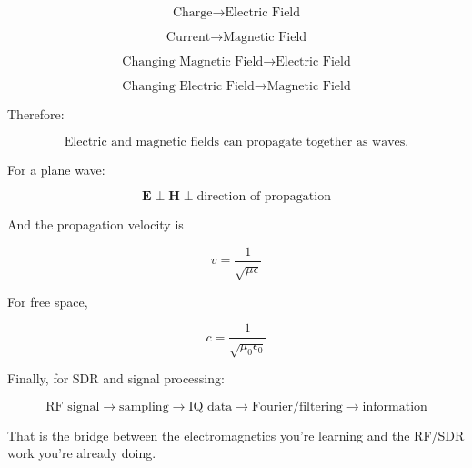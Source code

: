 \documentclass[11pt]{article}
\newcommand{\vect}[1]{\mathbf{#1}}
\begin{document}
\[
\boxed{
\text{Charge}
\rightarrow
\text{Electric Field}
}
\]

\[
\boxed{
\text{Current}
\rightarrow
\text{Magnetic Field}
}
\]

\[
\boxed{
\text{Changing Magnetic Field}
\rightarrow
\text{Electric Field}
}
\]

\[
\boxed{
\text{Changing Electric Field}
\rightarrow
\text{Magnetic Field}
}
\]

Therefore:

\[
\boxed{
\text{Electric and magnetic fields can propagate together as waves.}
}
\]

For a plane wave:

\[
\boxed{
\vect{E}
\perp
\vect{H}
\perp
\text{direction of propagation}
}
\]

And the propagation velocity is

\[
\boxed{
v
=
\frac{1}{\sqrt{\mu\epsilon}}
}
\]

For free space,

\[
\boxed{
c
=
\frac{1}{\sqrt{\mu_0\epsilon_0}}
}
\]

Finally, for SDR and signal processing:

\[
\boxed{
\text{RF signal}
\rightarrow
\text{sampling}
\rightarrow
\text{IQ data}
\rightarrow
\text{Fourier/filtering}
\rightarrow
\text{information}
}
\]

That is the bridge between the electromagnetics you're learning and the RF/SDR work you're already doing.
\end{document}
